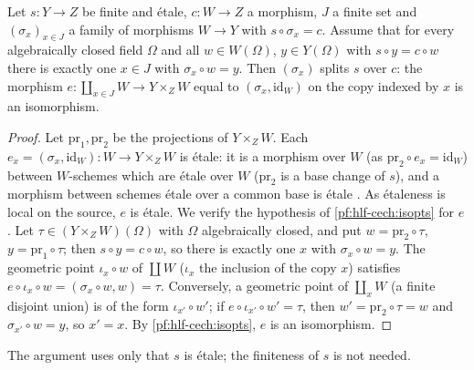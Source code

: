 \begin{proposition}\label{pf:hlf-cech:splitspts}
Let $s\colon Y\to Z$ be finite and \'etale, $c\colon W\to Z$ a morphism, $J$ a finite set and $(\sigma_x)_{x\in J}$ a family of morphisms
$W\to Y$ with $s\circ\sigma_x=c$. Assume that for every algebraically closed field $\Omega$ and all $w\in W(\Omega)$, $y\in Y(\Omega)$ with
$s\circ y=c\circ w$ there is exactly one $x\in J$ with $\sigma_x\circ w=y$. Then $(\sigma_x)$ splits $s$ over $c$: the morphism
$e\colon\coprod_{x\in J}W\to Y\times_ZW$ equal to $(\sigma_x,\mathrm{id}_W)$ on the copy indexed by $x$ is an isomorphism.
\end{proposition}

\begin{proof}
Let $\mathrm{pr}_1,\mathrm{pr}_2$ be the projections of $Y\times_ZW$. Each $e_x=(\sigma_x,\mathrm{id}_W)\colon W\to Y\times_ZW$ is \'etale: it is a
morphism over $W$ (as $\mathrm{pr}_2\circ e_x=\mathrm{id}_W$) between $W$-schemes which are \'etale over $W$ ($\mathrm{pr}_2$ is a base change of
$s$), and a morphism between schemes \'etale over a common base is \'etale \cite[Tag~02GW]{Stacks2024}. As \'etaleness is local on the
source, $e$ is \'etale. We
verify the hypothesis of \cref{pf:hlf-cech:isopts} for $e$. Let $\tau\in(Y\times_ZW)(\Omega)$ with $\Omega$ algebraically closed, and
put $w=\mathrm{pr}_2\circ\tau$, $y=\mathrm{pr}_1\circ\tau$; then $s\circ y=c\circ w$, so there is exactly one $x$ with $\sigma_x\circ w=y$.
The geometric point $\iota_x\circ w$ of $\coprod W$ ($\iota_x$ the inclusion of the copy $x$) satisfies $e\circ\iota_x\circ w=(\sigma_x\circ
w,w)=\tau$. Conversely, a geometric point of $\coprod_xW$ (a finite disjoint union) is of the form $\iota_{x'}\circ w'$; if
$e\circ\iota_{x'}\circ w'=\tau$, then $w'=\mathrm{pr}_2\circ\tau=w$ and $\sigma_{x'}\circ w=y$, so $x'=x$. By \cref{pf:hlf-cech:isopts},
$e$ is an isomorphism.
\end{proof}

\begin{remark}\label{pf:hlf-cech:rem:splits}
The argument uses only that $s$ is \'etale; the finiteness of $s$ is not needed.
\end{remark}
